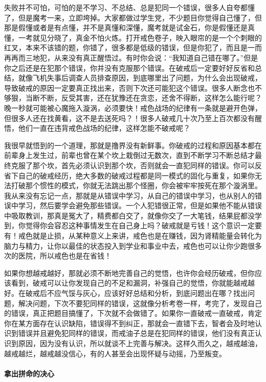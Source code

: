 失败并不可怕，可怕的是不学习、不总结、总是犯同一个错误，很多人自夸都懂了，但是魔考一来，立即垮掉。大家都做过学生党，不少题目你觉得自己懂了，但那是假懂或者是有点懂，并不是真懂和深懂，魔考就是试金石，你是假懂还是真懂，一考就见分晓了，真金不怕火炼。打开戒色卷子，映入眼帘的是一个个刺眼的红叉，本来不该错的题，你错了，很多都是低级的错误，但是你犯了，而且是一而再再而三地犯，从来没有真正醒悟过。有时你会说：“我知道自己错在哪了。”但是你之后还是在犯那个错误，你并没有克服那个错误。在破戒后一定要好好反省和总结，就像飞机失事后调查人员排查原因，到底哪里出了问题，为什么会出现破戒，导致破戒的原因一定要真正找出来，否则下次还可能犯这个错误。很多人断念也不够狠，当断不断，反受其害，还在犹豫还在贪恋，还舍不得断，这样怎么能行呢？晚一秒就可能被心魔拖入漩涡，必须要快！戒色战场的纪律有一条就是避开色弹，但很多人还在找黄看，这不是去送死吗？！很多人破戒几十次乃至上百次都没有醒悟，他们一直在违背戒色战场的纪律，这样怎能不破戒呢？

我很早就悟到的一个道理，那就是撸界没有新鲜事。你破戒的过程和原因基本都在前辈身上发生过，前辈也曾在某个坎上栽倒过无数次，直到不断学习不断总结才最终克服了那个坎，首先必须认识到那个坎，否则就会一直犯同样的错误。你可以反省下自己的破戒经历，绝大多数的破戒过程都是同一模式的固化与重复，如果你无法打破那个惯性的模式，你就无法跳出那个怪圈，你会被牢牢按死在那个漩涡里。我从来没有忘记一点，那就是从错误中学习，从自己的错误中学习，也从别人的错误中学习，然后要学会避免那些错误。一个人犯错很正常，但是如果他不能从错误中吸取教训，那真是冤大了，精费都白交了，就像你交了一大笔钱，结果屁都没学到，你觉得你会容忍这种事情发生在自己身上吗？破戒就是亏钱！这个意识一定要有！戒色就是止损，从某种意义上来讲，戒色也是在赚钱，因为肾精能量会转化为脑力与精力，让你以最佳的状态投入到学业和事业中去，戒色也可以让你少跑很多次的医院，所以戒色也是在省钱！

如果你想越戒越好，那就必须不断地完善自己的觉悟，也许你会经历破戒，但你应该看到，破戒可以让你发现自己的不足和漏洞，补强自己的觉悟，你就能越戒越好。在破戒后不应气馁与灰心，应该好好总结和分析，到底问题出在哪？找出问题，解决问题，下次不要犯同样的错误，这就像分析考卷一样，考完了，发现自己的错误，真正把题目搞懂了，下次就不会做错了。如果你一直破戒一直破戒，肯定你在某方面存在认识缺陷，错误得不到纠正，那就会一直错下去，智者会及时地认识到错误并且避免犯同样的错误，而戒油子总是在犯同样的错误，他们没有真正认识到原因，因为没有认识，所以就谈不上完善与解决。这样久而久之，越戒越油，越戒越烂，越戒越没信心，有的人甚至会出现怀疑与动摇，乃至叛变。

\paragraph{拿出拼命的决心}

